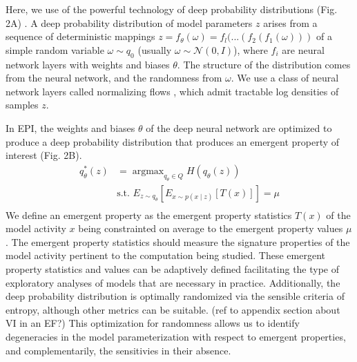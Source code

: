 \documentclass[11pt]{article}
\DeclareMathOperator*{\argmax}{argmax}
\begin{document}
Here, we use of the powerful technology of deep probability distributions (Fig. 2A) \cite{best_image_DGM, wavenet}.
A deep probability distribution of model parameters $z$ arises from a sequence of deterministic mappings $z = f_\theta(\omega) = f_l(...(f_2(f_1(\omega)))$ of a simple random variable $\omega \sim q_0$ (usually $\omega \sim \mathcal{N}(0, I)$), where $f_i$ are neural network layers  with weights and biases $\theta$.
The structure of the distribution comes from the neural network, and the randomness from $\omega$.
We use a class of neural network layers called normalizing flows \cite{rezende2015variational}, which admit tractable log densities of samples $z$.

In EPI, the weights and biases $\theta$ of the deep neural network are optimized to produce a deep probability distribution that produces an emergent property of interest (Fig. 2B). 
\begin{equation}
\begin{split}
q_\theta^*(z) &= \argmax_{q_\theta \in Q} H(q_\theta(z)) \\
 &  \text{s.t.  } E_{z \sim q_\theta}\left[ E_{x\sim p(x \mid z)}\left[T(x)\right] \right] = \mu \\
 \end{split}
\end{equation}
We define an emergent property as the emergent property statistics $T(x)$ of the model activity $x$ being constrainted on average to the emergent property values $\mu$ .  The emergent property statistics should measure the signature properties of the model activity pertinent to the computation being studied.  These emergent property statistics and values can be adaptively defined facilitating the type of exploratory analyses of models that are necessary in practice.  Additionally, the deep probability distribution is optimally randomized via the sensible criteria of entropy, although other metrics can be suitable. (ref to appendix section about VI in an EF?) This optimization for randomness allows us to identify degeneracies in the model parameterization with respect to emergent properties, and complementarily, the sensitivies in their absence.
\end{document}
